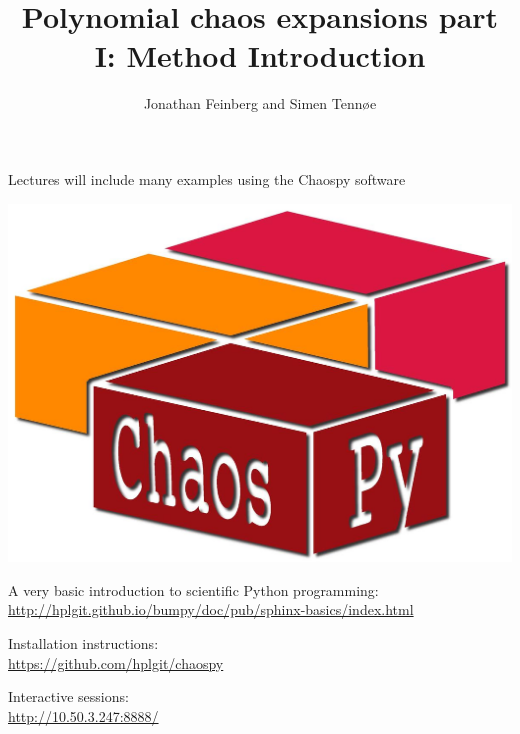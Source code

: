 \documentclass{beamer}
\title{Polynomial chaos expansions part I: Method Introduction}
\author{Jonathan Feinberg and Simen Tennøe}
\begin{document}
\begin{frame}
  \maketitle
\end{frame}

\begin{frame}[fragile]{Lectures will include many examples using the
    Chaospy software}
  \begin{center}
     \includegraphics[width=.5\textwidth]{chaospy_logo.jpg}
  \end{center}
    \begin{alert}{A very basic introduction to scientific Python programming:}
    \scriptsize
      \href{http://hplgit.github.io/bumpy/doc/pub/sphinx-basics/index.html}{http://hplgit.github.io/bumpy/doc/pub/sphinx-basics/index.html}\\
  \end{alert}
  \begin{alert}{Installation instructions:}\\
  \scriptsize
      \href{https://github.com/hplgit/chaospy}{https://github.com/hplgit/chaospy}\\
  \end{alert}
    \begin{alert}{Interactive sessions:}\\
  \scriptsize
\href{http://10.50.3.247:8888/}{http://10.50.3.247:8888/}

  \end{alert}
\end{frame}
\end{document}
